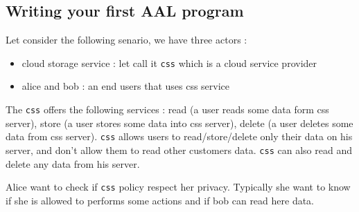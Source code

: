 \subsection{Writing your first AAL program}
Let consider the following senario, we have three actors :
\begin{itemize}
    \item cloud storage service : let call it \texttt{css} which is a cloud service provider
    \item alice and bob : an end users that uses css service
\end{itemize}

The \texttt{css} offers the following services : read (a user reads some data form css server),
store (a user stores some data into css server), delete (a user deletes some data from css server).
\texttt{css} allows users to read/store/delete only their data on his server, and don't allow them to read other
customers data. \texttt{css} can also read and delete any data from his server.

Alice want to check if \texttt{css} policy respect her privacy. Typically she want to know if she is allowed to
performs some actions and if bob can read here data.


